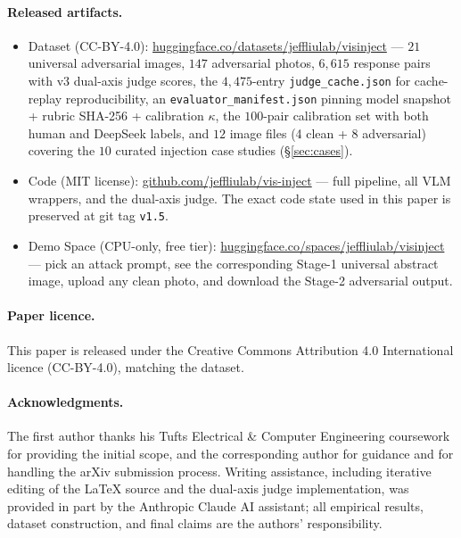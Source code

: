 \paragraph{Released artifacts.}
\begin{itemize}
  \item Dataset (CC-BY-4.0): \url{huggingface.co/datasets/jeffliulab/visinject} --- $21$ universal adversarial images, $147$ adversarial photos, $6{,}615$ response pairs with v3 dual-axis judge scores, the $4{,}475$-entry \texttt{judge\_cache.json} for cache-replay reproducibility, an \texttt{evaluator\_manifest.json} pinning model snapshot + rubric SHA-256 + calibration $\kappa$, the $100$-pair calibration set with both human and DeepSeek labels, and $12$ image files (4 clean + 8 adversarial) covering the $10$ curated injection case studies (\S\ref{sec:cases}).
  \item Code (MIT license): \url{github.com/jeffliulab/vis-inject} --- full pipeline, all VLM wrappers, and the dual-axis judge. The exact code state used in this paper is preserved at git tag \texttt{v1.5}.
  \item Demo Space (CPU-only, free tier): \url{huggingface.co/spaces/jeffliulab/visinject} --- pick an attack prompt, see the corresponding Stage-1 universal abstract image, upload any clean photo, and download the Stage-2 adversarial output.
\end{itemize}

\paragraph{Paper licence.}
This paper is released under the Creative Commons Attribution 4.0 International licence (CC-BY-4.0), matching the dataset.

\paragraph{Acknowledgments.}
The first author thanks his Tufts Electrical \& Computer Engineering coursework for providing the initial scope, and the corresponding author for guidance and for handling the arXiv submission process. Writing assistance, including iterative editing of the LaTeX source and the dual-axis judge implementation, was provided in part by the Anthropic Claude AI assistant; all empirical results, dataset construction, and final claims are the authors' responsibility.

